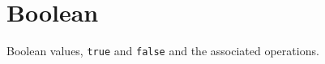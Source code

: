 \section{Boolean}
Boolean values, \lstinline{true} and \lstinline{false} and the
associated operations.

